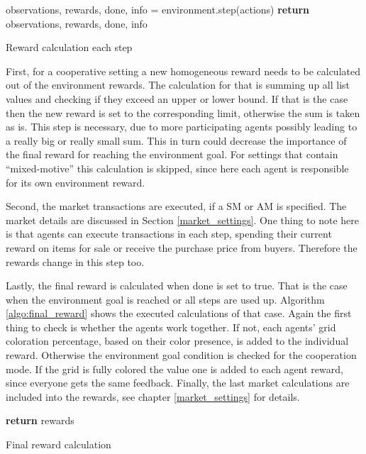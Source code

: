 \begin{algorithm}[H]
    \DontPrintSemicolon
    observations, rewards, done, info = environment.step(actions)\;
    \textbf{return} observations, rewards, done, info\;
    \caption{Reward calculation each step}\label{algo:step_reward}
\end{algorithm}

First, for a cooperative setting a new homogeneous reward needs to be calculated out of the environment rewards. The calculation for that is summing up all list values and checking if they exceed an upper or lower bound. If that is the case then the new reward is set to the corresponding limit, otherwise the sum is taken as is. This step is necessary, due to more participating agents possibly leading to a really big or really small sum. This in turn could decrease the importance of the final reward for reaching the environment goal. For settings that contain ``mixed-motive'' this calculation is skipped, since here each agent is responsible for its own environment reward.

Second, the market transactions are executed, if a SM or AM is specified. The market details are discussed in Section \ref{market_settings}. One thing to note here is that agents can execute transactions in each step, spending their current reward on items for sale or receive the purchase price from buyers. Therefore the rewards change in this step too.

Lastly, the final reward is calculated when done is set to true. That is the case when the environment goal is reached or all steps are used up. Algorithm \ref{algo:final_reward} shows the executed calculations of that case. Again the first thing to check is whether the agents work together. If not, each agents' grid coloration percentage, based on their color presence, is added to the individual reward. Otherwise the environment goal condition is checked for the cooperation mode. If the grid is fully colored the value one is added to each agent reward, since everyone gets the same feedback. Finally, the last market calculations are included into the rewards, see chapter \ref{market_settings} for details.

\begin{algorithm}[H]
    \DontPrintSemicolon
    \textbf{return} rewards\;
    \caption{Final reward calculation}\label{algo:final_reward}
\end{algorithm}


